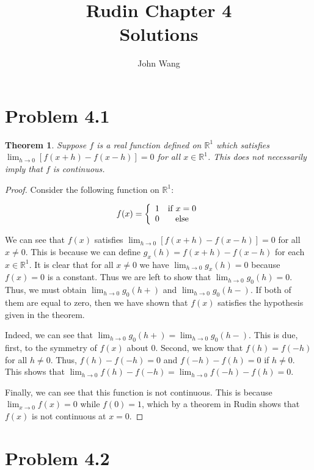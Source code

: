 \documentclass[psamsfonts]{amsart}
\title{Rudin Chapter 4\\
Solutions }
\author{John Wang}
\newtheorem{thm}{Theorem}[section]
\theoremstyle{definition}
\theoremstyle{remark}
\numberwithin{equation}{section}
\begin{document}
\maketitle


\section{Problem 4.1}

\begin{thm}
Suppose $f$ is a real function defined on $\mathbb{R}^1$ which satisfies $\lim_{h \to 0} [f(x+h) - f(x-h)] = 0$ for all $x \in \mathbb{R}^1$. This does not necessarily imply that $f$ is continuous.
\end{thm}

\begin{proof}
Consider the following function on $\mathbb{R}^1$:

\begin{equation}
f(x) = \left\{ \begin{array}{c c}
1 & \text{if } x = 0 \\
0 & \text{else}
\end{array} \right.
\end{equation}

We can see that $f(x)$ satisfies $\lim_{h \to 0} [f(x+h) - f(x-h)] = 0$ for all $x \neq 0$. This is because we can define $g_x(h) = f(x+h) - f(x-h)$ for each $x \in \mathbb{R}^1$. It is clear that for all $x \neq 0$ we have $\lim_{h \to 0} g_x(h) = 0$ because $f(x) = 0$ is a constant. Thus we are left to show that $\lim_{h \to 0} g_0(h) = 0$. Thus, we must obtain $\lim_{h \to 0} g_0(h+)$ and $\lim_{h \to 0} g_0(h-)$. If both of them are equal to zero, then we have shown that $f(x)$ satisfies the hypothesis given in the theorem.

Indeed, we can see that $\lim_{h \to 0} g_0(h+)=\lim_{h \to 0} g_0(h-)$. This is due, first, to the symmetry of $f(x)$ about $0$. Second, we know that $f(h) = f(-h)$ for all $h \neq 0$. Thus, $f(h) - f(-h) = 0$ and $f(-h) - f(h) = 0$ if $h \neq 0$. This shows that $\lim_{h \to 0} f(h) - f(-h) = \lim_{h \to 0} f(-h) - f(h) = 0$.

Finally, we can see that this function is not continuous. This is because $\lim_{x \to 0} f(x) = 0$ while $f(0) = 1$, which by a theorem in Rudin shows that $f(x)$ is not continuous at $x = 0$.  
\end{proof}

\section{Problem 4.2}
\end{document}
